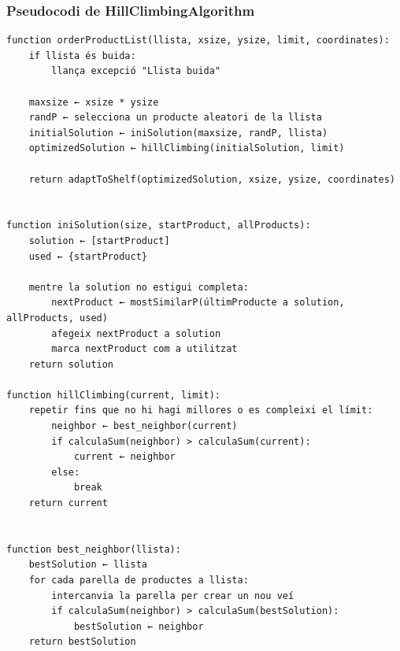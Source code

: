 \documentclass[a4paper, t]{article}
\begin{document}
\subsubsection{Pseudocodi de HillClimbingAlgorithm}
\begin{verbatim}
function orderProductList(llista, xsize, ysize, limit, coordinates):
    if llista és buida:
        llança excepció "Llista buida"

    maxsize ← xsize * ysize
    randP ← selecciona un producte aleatori de la llista
    initialSolution ← iniSolution(maxsize, randP, llista)
    optimizedSolution ← hillClimbing(initialSolution, limit)

    return adaptToShelf(optimizedSolution, xsize, ysize, coordinates)


function iniSolution(size, startProduct, allProducts):
    solution ← [startProduct]
    used ← {startProduct}

    mentre la solution no estigui completa:
        nextProduct ← mostSimilarP(últimProducte a solution, allProducts, used)
        afegeix nextProduct a solution
        marca nextProduct com a utilitzat
    return solution

function hillClimbing(current, limit):
    repetir fins que no hi hagi millores o es compleixi el límit:
        neighbor ← best_neighbor(current)
        if calculaSum(neighbor) > calculaSum(current):
            current ← neighbor
        else:
            break
    return current


function best_neighbor(llista):
    bestSolution ← llista
    for cada parella de productes a llista:
        intercanvia la parella per crear un nou veí
        if calculaSum(neighbor) > calculaSum(bestSolution):
            bestSolution ← neighbor
    return bestSolution
\end{verbatim}
\end{document}
